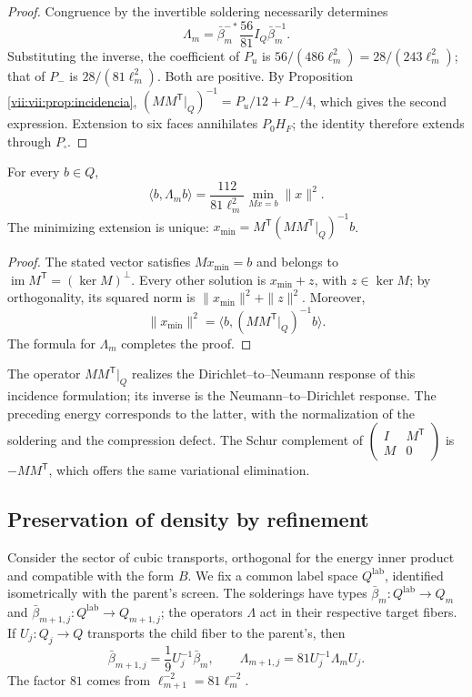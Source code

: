 \begin{proof}
Congruence by the invertible soldering necessarily determines
\[
 \Lambda_m=\bar\beta_m^{-*}\frac{56}{81}I_Q\bar\beta_m^{-1}.
\]
Substituting the inverse, the coefficient of \(P_u\) is
\(56/(486\ell_m^2)=28/(243\ell_m^2)\); that of \(P_-\) is
\(28/(81\ell_m^2)\). Both are positive. By
Proposition \ref{vii:vii:prop:incidencia},
\((MM^{\mathsf T}|_Q)^{-1}=P_u/12+P_-/4\),
which gives the second expression. Extension to six faces annihilates
\(P_0H_F\); the identity therefore extends through \(P_\square\).
\end{proof}

\begin{proposition}
\label{vii:vii:prop:minima-extension}
For every \(b\in Q\),
\[
 \langle b,\Lambda_m b\rangle
 =\frac{112}{81\ell_m^2}
   \min_{Mx=b}\|x\|^2.
\]
The minimizing extension is unique:
\(x_{\min}=M^{\mathsf T}(MM^{\mathsf T}|_Q)^{-1}b\).
\end{proposition}

\begin{proof}
The stated vector satisfies \(Mx_{\min}=b\) and belongs to
\(\operatorname{im}M^{\mathsf T}=(\ker M)^\perp\).
Every other solution is \(x_{\min}+z\), with \(z\in\ker M\); by
orthogonality, its squared norm is \(\|x_{\min}\|^2+\|z\|^2\).
Moreover,
\[
 \|x_{\min}\|^2
 =\langle b,(MM^{\mathsf T}|_Q)^{-1}b\rangle.
\]
The formula for \(\Lambda_m\) completes the proof.
\end{proof}

The operator \(MM^{\mathsf T}|_Q\) realizes the
Dirichlet--to--Neumann response of this incidence formulation; its inverse
is the Neumann--to--Dirichlet response. The preceding energy corresponds
to the latter, with the normalization of the soldering and the compression
defect. The Schur complement of
\(\left(\begin{smallmatrix}I&M^{\mathsf T}\\M&0\end{smallmatrix}\right)\)
is \(-MM^{\mathsf T}\), which offers the same variational elimination.

\subsection{Preservation of density by refinement}
\label{vii:vii:sec:densidad-refinamiento}

Consider the sector of cubic transports, orthogonal for the energy
inner product and compatible with the form \(B\). We fix a
common label space \(Q^{\mathrm{lab}}\), identified
isometrically with the parent's screen. The solderings have
types
\(\bar\beta_m:Q^{\mathrm{lab}}\longrightarrow Q_m\) and
\(\bar\beta_{m+1,j}:Q^{\mathrm{lab}}\longrightarrow Q_{m+1,j}\);
the operators \(\Lambda\) act in their respective target fibers.
If
\(U_j:Q_j\longrightarrow Q\) transports the child fiber to the parent's,
then
\[
 \bar\beta_{m+1,j}=\frac19U_j^{-1}\bar\beta_m,\qquad
 \Lambda_{m+1,j}=81U_j^{-1}\Lambda_mU_j.
\]
The factor \(81\) comes from \(\ell_{m+1}^{-2}=81\ell_m^{-2}\).

